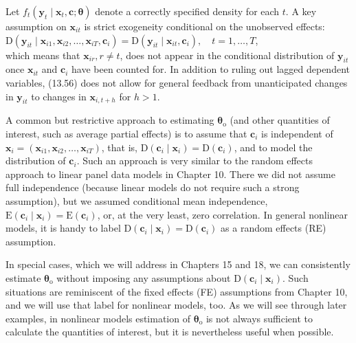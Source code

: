 \documentclass[10pt]{article}
\begin{document}
Let $f_{t}\left(\mathbf{y}_{t} \mid \mathbf{x}_{t}, \mathbf{c} ; \boldsymbol{\theta}\right)$ denote a correctly specified density for each $t$. A key assumption on $\mathbf{x}_{i t}$ is strict exogeneity conditional on the unobserved effects:\\
$\mathrm{D}\left(\mathbf{y}_{i t} \mid \mathbf{x}_{i 1}, \mathbf{x}_{i 2}, \ldots, \mathbf{x}_{i T}, \mathbf{c}_{i}\right)=\mathrm{D}\left(\mathbf{y}_{i t} \mid \mathbf{x}_{i t}, \mathbf{c}_{i}\right), \quad t=1, \ldots, T$,\\
which means that $\mathbf{x}_{i r}, r \neq t$, does not appear in the conditional distribution of $\mathbf{y}_{i t}$ once $\mathbf{x}_{i t}$ and $\mathbf{c}_{i}$ have been counted for. In addition to ruling out lagged dependent variables, (13.56) does not allow for general feedback from unanticipated changes in $\mathbf{y}_{i t}$ to changes in $\mathbf{x}_{i, t+h}$ for $h>1$.

A common but restrictive approach to estimating $\boldsymbol{\theta}_{\mathrm{o}}$ (and other quantities of interest, such as average partial effects) is to assume that $\mathbf{c}_{i}$ is independent of $\mathbf{x}_{i}= \left(\mathbf{x}_{i 1}, \mathbf{x}_{i 2}, \ldots, \mathbf{x}_{i T}\right)$, that is, $\mathrm{D}\left(\mathbf{c}_{i} \mid \mathbf{x}_{i}\right)=\mathrm{D}\left(\mathbf{c}_{i}\right)$, and to model the distribution of $\mathbf{c}_{i}$. Such an approach is very similar to the random effects approach to linear panel data models in Chapter 10. There we did not assume full independence (because linear models do not require such a strong assumption), but we assumed conditional mean independence, $\mathrm{E}\left(\mathbf{c}_{i} \mid \mathbf{x}_{i}\right)=\mathrm{E}\left(\mathbf{c}_{i}\right)$, or, at the very least, zero correlation. In general nonlinear models, it is handy to label $\mathrm{D}\left(\mathbf{c}_{i} \mid \mathbf{x}_{i}\right)=\mathrm{D}\left(\mathbf{c}_{i}\right)$ as a random effects (RE) assumption.

In special cases, which we will address in Chapters 15 and 18, we can consistently estimate $\boldsymbol{\theta}_{\mathrm{o}}$ without imposing any assumptions about $\mathrm{D}\left(\mathbf{c}_{i} \mid \mathbf{x}_{i}\right)$. Such situations are reminiscent of the fixed effects (FE) assumptions from Chapter 10, and we will use that label for nonlinear models, too. As we will see through later examples, in nonlinear models estimation of $\boldsymbol{\theta}_{\mathrm{o}}$ is not always sufficient to calculate the quantities of interest, but it is nevertheless useful when possible.
\end{document}
